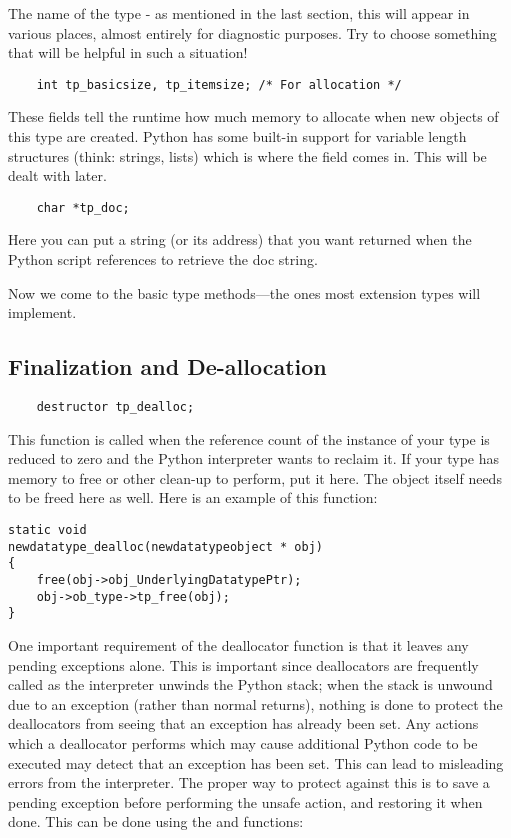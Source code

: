 The name of the type - as mentioned in the last section, this will
appear in various places, almost entirely for diagnostic purposes.
Try to choose something that will be helpful in such a situation!

\begin{verbatim}
    int tp_basicsize, tp_itemsize; /* For allocation */
\end{verbatim}

These fields tell the runtime how much memory to allocate when new
objects of this type are created.  Python has some built-in support
for variable length structures (think: strings, lists) which is where
the  field comes in.  This will be dealt with
later.

\begin{verbatim}
    char *tp_doc;
\end{verbatim}

Here you can put a string (or its address) that you want returned when
the Python script references  to retrieve the
doc string.

Now we come to the basic type methods---the ones most extension types
will implement.


\subsection{Finalization and De-allocation}


\begin{verbatim}
    destructor tp_dealloc;
\end{verbatim}

This function is called when the reference count of the instance of
your type is reduced to zero and the Python interpreter wants to
reclaim it.  If your type has memory to free or other clean-up to
perform, put it here.  The object itself needs to be freed here as
well.  Here is an example of this function:

\begin{verbatim}
static void
newdatatype_dealloc(newdatatypeobject * obj)
{
    free(obj->obj_UnderlyingDatatypePtr);
    obj->ob_type->tp_free(obj);
}
\end{verbatim}

One important requirement of the deallocator function is that it
leaves any pending exceptions alone.  This is important since
deallocators are frequently called as the interpreter unwinds the
Python stack; when the stack is unwound due to an exception (rather
than normal returns), nothing is done to protect the deallocators from
seeing that an exception has already been set.  Any actions which a
deallocator performs which may cause additional Python code to be
executed may detect that an exception has been set.  This can lead to
misleading errors from the interpreter.  The proper way to protect
against this is to save a pending exception before performing the
unsafe action, and restoring it when done.  This can be done using the
 and
 functions:

